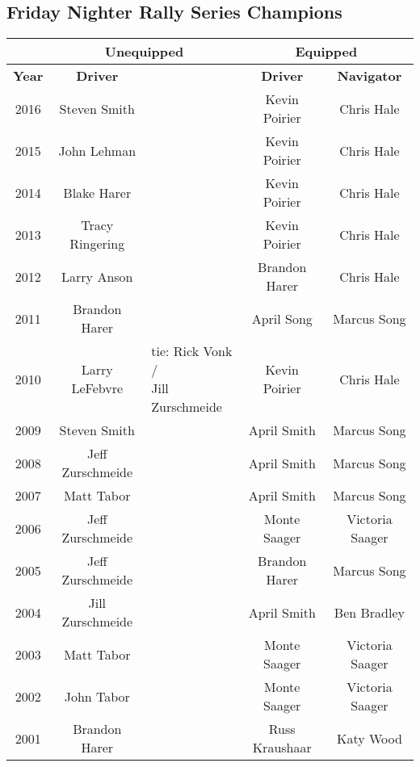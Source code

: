 \subsection{Friday Nighter Rally Series Champions}
{
\scriptsize
\begin{tabular}{|c|c|p{3cm}|c|c|}
\hline
 & \multicolumn{2}{|c|}{Unequipped} & \multicolumn{2}{|c|}{Equipped} \\
\hline
\textbf{Year} & \textbf{Driver} & \centering{\textbf{Navigator}} & \textbf{Driver} & \textbf{Navigator} \\
\hline
2016 & Steven Smith & \centering{John Masterman} & Kevin Poirier & Chris Hale \\
\hline
2015 & John Lehman & \centering{Mitchell Mlinar} & Kevin Poirier & Chris Hale \\
\hline
2014 & Blake Harer & \centering{Brandon Harer} & Kevin Poirier & Chris Hale \\
\hline
2013 & Tracy Ringering & \centering{Simon Levear} & Kevin Poirier & Chris Hale \\
\hline
2012 & Larry Anson & \centering{Fran Hanchek} & Brandon Harer & Chris Hale \\
\hline
2011 & Brandon Harer & \centering{Marcus Gattman} & April Song & Marcus Song \\
\hline
2010 & Larry LeFebvre & \centering{tie: Rick Vonk /\newline Jill Zurschmeide} & Kevin Poirier & Chris Hale \\
\hline
2009 & Steven Smith & \centering{John Masterman} & April Smith & Marcus Song \\
\hline
2008 & Jeff Zurschmeide & \centering{Jill Zurschmeide} & April Smith & Marcus Song \\
\hline
2007 & Matt Tabor & \centering{Marcus Gattman} & April Smith & Marcus Song \\
\hline
2006 & Jeff Zurschmeide & \centering{Jill Zurschmeide} & Monte Saager & Victoria Saager \\
\hline
2005 & Jeff Zurschmeide & \centering{Jill Zurschmeide} & Brandon Harer & Marcus Song \\
\hline
2004 & Jill Zurschmeide & \centering{Jeff Zurschmeide} & April Smith & Ben Bradley \\
\hline
2003 & Matt Tabor & \centering{Marcus Gattman} & Monte Saager & Victoria Saager \\
\hline
2002 & John Tabor & \centering{Darlene Tabor} & Monte Saager & Victoria Saager \\
\hline
2001 & Brandon Harer & \centering{Jennifer McGrew} & Russ Kraushaar & Katy Wood \\
\hline
\end{tabular}
}
